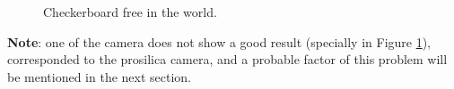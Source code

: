 \begin{figure}[!htbp]
 \centering
 \caption{Checkerboard free in the world.}
 \label{fig:cal_free}
\end{figure}

\noindent
\textbf{Note}: one of the camera does not show a good result (specially in Figure \ref{fig:cal_free}), corresponded to the prosilica camera, and a probable factor of this problem will be mentioned in the next section.


